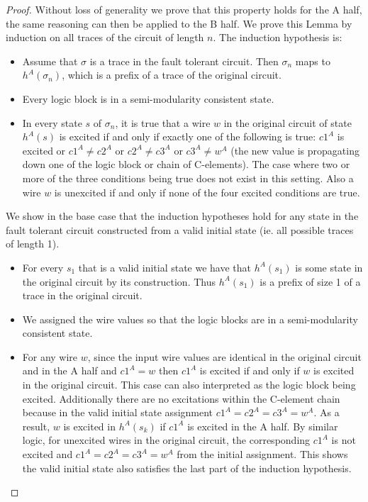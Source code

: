 \documentclass[12pt]{report}
\begin{document}
\begin{proof}
Without loss of generality we prove that this property holds for the A half, the same reasoning can then be applied to the B half.  We prove this Lemma by induction on all traces of the circuit of length $n$.  The induction hypothesis is:
\begin{itemize}
\item Assume that $\sigma$ is a trace in the fault tolerant circuit.  Then $\sigma_n$ maps to $h^{A}(\sigma_n)$, which is a prefix of a trace of the original circuit.
\item Every logic block is in a semi-modularity consistent state.  %
\item In every state $s$ of $\sigma_n$, it is true that a wire $w$ in the original circuit of state $h^A(s)$ is excited if and only if exactly one of the following is true: $c1^A$ is excited or $c1^{A}\neq c2^{A}$ or $c2^{A}\neq c3^A$ or $c3^{A}\neq w^A$ (the new value is propagating down one of the logic block or chain of C-elements).  The case where two or more of the three conditions being true does not exist in this setting.  Also a wire $w$ is unexcited if and only if none of the four excited conditions are true. \\
\end{itemize}
We show in the base case that the induction hypotheses hold for any state in the fault tolerant circuit constructed from a valid initial state (ie. all possible traces of length 1). 
\begin{itemize}
\item For every $s_1$ that is a valid initial state we have that $h^A(s_1)$ is some state in the original circuit by its construction.  Thus $h^A(s_1)$ is a prefix of size 1 of a trace in the original circuit.  
\item We assigned the wire values so that the logic blocks are in a semi-modularity consistent state.  
\item For any wire $w$, since the input wire values are identical in the original circuit and in the A half and $c1^A=w$ then $c1^A$ is excited if and only if $w$ is excited in the original circuit.  This case can also interpreted as the logic block being excited.  Additionally there are no excitations within the C-element chain because in the valid initial state assignment $c1^A=c2^A=c3^A=w^A$.  As a result, $w$ is excited in $h^A(s_k)$ if $c1^A$ is excited in the A half.  By similar logic, for unexcited wires in the original circuit, the corresponding $c1^A$ is not excited and $c1^A=c2^A=c3^A=w^A$ from the initial assignment.  This shows the valid initial state also satisfies the last part of the induction hypothesis.    %
\end{itemize}


\end{proof}
\end{document}
